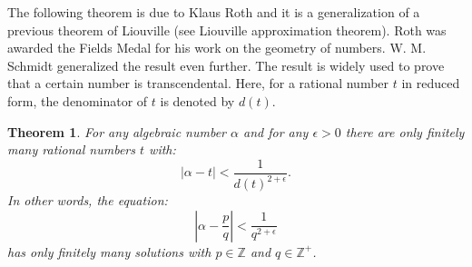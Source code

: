 \documentclass[12pt]{article}
\newtheorem{thm}{Theorem}
\newcommand{\Ints}{\mathbb{Z}}
\begin{document}
The following theorem is due to Klaus Roth and it is a generalization of a previous theorem of Liouville (see Liouville approximation theorem). Roth was awarded the Fields Medal for his work on the geometry of numbers. W. M. Schmidt generalized the result even further. The result is widely used to prove that a certain number is transcendental. Here, for a rational number $t$ in reduced form, the denominator of $t$ is denoted by $d(t)$.

\begin{thm}
For any algebraic number $\alpha$ and for any $\epsilon>0$ there are only finitely many rational numbers $t$ with:
$$|\alpha - t| < \frac{1}{d(t)^{2+\epsilon}}.$$
In other words, the equation:
$$\left|\alpha - \frac{p}{q}\right| < \frac{1}{q^{2+\epsilon}}$$
has only finitely many solutions with $p\in \Ints$ and $q\in \Ints^+$.
\end{thm}
\end{document}
